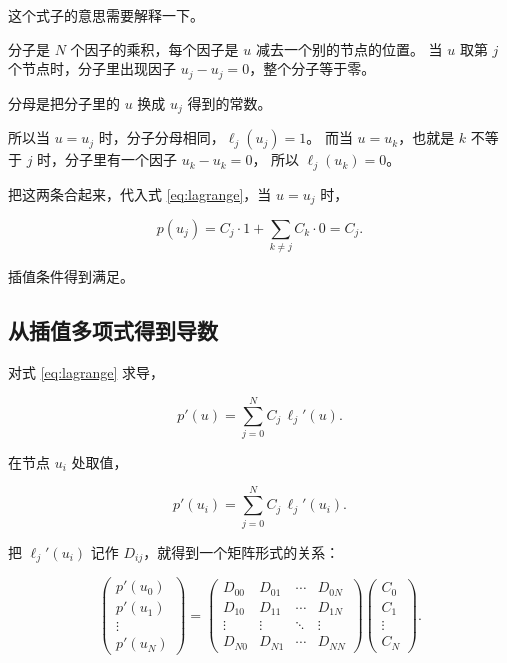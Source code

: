 这个式子的意思需要解释一下。

分子是 $N$ 个因子的乘积，每个因子是 $u$ 减去一个别的节点的位置。
当 $u$ 取第 $j$ 个节点时，分子里出现因子 $u_j-u_j=0$，整个分子等于零。

分母是把分子里的 $u$ 换成 $u_j$ 得到的常数。

所以当 $u=u_j$ 时，分子分母相同，$\ell_j(u_j)=1$。
而当 $u=u_k$，也就是 $k$ 不等于 $j$ 时，分子里有一个因子 $u_k-u_k=0$，
所以 $\ell_j(u_k)=0$。

把这两条合起来，代入式 \eqref{eq:lagrange}，当 $u=u_j$ 时，

\begin{equation}
p(u_j) = C_j\cdot1 + \sum_{k\ne j}C_k\cdot0 = C_j .
\end{equation}

插值条件得到满足。

\subsection{从插值多项式得到导数}

对式 \eqref{eq:lagrange} 求导，

\begin{equation}
p'(u) = \sum_{j=0}^{N}C_j\,\ell_j'(u).
\end{equation}

在节点 $u_i$ 处取值，

\begin{equation}
p'(u_i) = \sum_{j=0}^{N}C_j\,\ell_j'(u_i).
\end{equation}

把 $\ell_j'(u_i)$ 记作 $D_{ij}$，就得到一个矩阵形式的关系：

\begin{equation}
\begin{pmatrix} p'(u_0)\\ p'(u_1)\\ \vdots\\ p'(u_N)\end{pmatrix}
=
\begin{pmatrix}
D_{00} & D_{01} & \cdots & D_{0N}\\
D_{10} & D_{11} & \cdots & D_{1N}\\
\vdots & \vdots & \ddots & \vdots\\
D_{N0} & D_{N1} & \cdots & D_{NN}
\end{pmatrix}
\begin{pmatrix} C_0\\ C_1\\ \vdots\\ C_N\end{pmatrix}.
\label{eq:dmatrix}
\end{equation}

